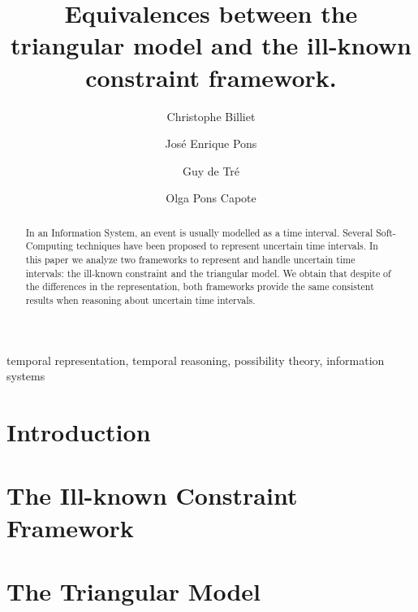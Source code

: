 \documentclass[twocolumn,a4paper]{article}
\theoremstyle{definition}
\begin{document}
\title{Equivalences between the triangular model and the ill-known constraint framework.}

\begin{aug}
\author[1]{Christophe Billiet}
\author[2]{Jos\'{e} Enrique Pons}
\author[1]{Guy de Tr\'{e}}
\author[2]{Olga Pons Capote}
\end{aug}


\maketitle
\thispagestyle{empty}

\begin{abstract}
In an Information System, an event is usually modelled as a time interval. Several Soft-Computing techniques have been proposed to represent uncertain time intervals. In this paper we analyze two frameworks to represent and handle uncertain time intervals: the ill-known constraint and the triangular model. We obtain that despite of the differences in the representation, both frameworks provide the same consistent results when reasoning about uncertain time intervals.
\end{abstract}

\begin{keywords}
temporal representation, temporal reasoning, possibility theory, information systems
\end{keywords}

\section{\label{sec:introduction}Introduction}



\section{\label{sec:preliminaries}The Ill-known Constraint Framework}


\section{\label{sec:triangular-model}The Triangular Model}

\end{document}
